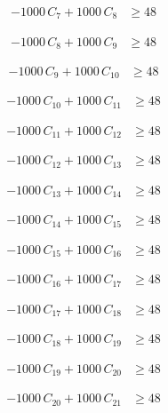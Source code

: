 \documentclass[a4paper,11pt]{article}
\begin{document}
\begin{align}
-1000\,C_{7} + 1000\,C_{8} &\geq 48 \nonumber
\end{align}

\begin{align}
-1000\,C_{8} + 1000\,C_{9} &\geq 48 \nonumber
\end{align}

\begin{align}
-1000\,C_{9} + 1000\,C_{10} &\geq 48 \nonumber
\end{align}

\begin{align}
-1000\,C_{10} + 1000\,C_{11} &\geq 48 \nonumber
\end{align}

\begin{align}
-1000\,C_{11} + 1000\,C_{12} &\geq 48 \nonumber
\end{align}

\begin{align}
-1000\,C_{12} + 1000\,C_{13} &\geq 48 \nonumber
\end{align}

\begin{align}
-1000\,C_{13} + 1000\,C_{14} &\geq 48 \nonumber
\end{align}

\begin{align}
-1000\,C_{14} + 1000\,C_{15} &\geq 48 \nonumber
\end{align}

\begin{align}
-1000\,C_{15} + 1000\,C_{16} &\geq 48 \nonumber
\end{align}

\begin{align}
-1000\,C_{16} + 1000\,C_{17} &\geq 48 \nonumber
\end{align}

\begin{align}
-1000\,C_{17} + 1000\,C_{18} &\geq 48 \nonumber
\end{align}

\begin{align}
-1000\,C_{18} + 1000\,C_{19} &\geq 48 \nonumber
\end{align}

\begin{align}
-1000\,C_{19} + 1000\,C_{20} &\geq 48 \nonumber
\end{align}

\begin{align}
-1000\,C_{20} + 1000\,C_{21} &\geq 48 \nonumber
\end{align}
\end{document}
